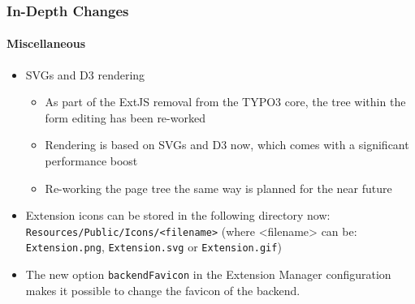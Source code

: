 \begin{frame}[fragile]
	\frametitle{In-Depth Changes}
	\framesubtitle{Miscellaneous}

	\begin{itemize}

		\item SVGs and D3 rendering

			\begin{itemize}
				\item As part of the ExtJS removal from the TYPO3 core, the tree within the form editing has been re-worked
				\item Rendering is based on SVGs and D3 now, which comes with a significant performance boost
				\item Re-working the page tree the same way is planned for the near future
			\end{itemize}

		\item Extension icons can be stored in the following directory now:\newline
			\small
				\texttt{Resources/Public/Icons/<filename>}
				(where <filename> can be: \texttt{Extension.png}, \texttt{Extension.svg} or \texttt{Extension.gif})
			\normalsize

		\item The new option \texttt{backendFavicon} in the Extension Manager configuration makes it possible to
			change the favicon of the backend.

	\end{itemize}

\end{frame}

